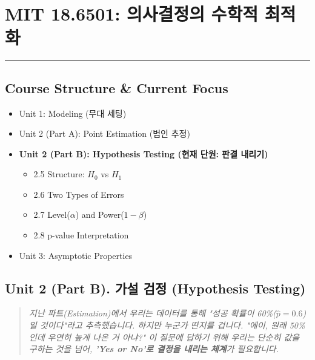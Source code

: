 \documentclass[11pt,a4paper]{book}
\theoremstyle{definition}
\begin{document}
\chapter{MIT 18.6501: 의사결정의 수학적 최적화}
\label{ch:lecture5}


\vspace{1cm}
\hrule
\vspace{1cm}

\section*{Course Structure \& Current Focus}
\begin{itemize}
    \item Unit 1: Modeling (무대 세팅)
    \item Unit 2 (Part A): Point Estimation (범인 추정)
    \item \textbf{\textcolor{mainblue}{Unit 2 (Part B): Hypothesis Testing (현재 단원: 판결 내리기)}}
    \begin{itemize}
        \item 2.5 Structure: $H_0$ vs $H_1$
        \item 2.6 Two Types of Errors
        \item 2.7 Level($\alpha$) and Power($1-\beta$)
        \item 2.8 p-value Interpretation
    \end{itemize}
    \item Unit 3: Asymptotic Properties
\end{itemize}


\section{Unit 2 (Part B). 가설 검정 (Hypothesis Testing)}

\begin{quote}
\textit{지난 파트(Estimation)에서 우리는 데이터를 통해 "성공 확률이 60\%($\hat{p}=0.6$)일 것이다"라고 추측했습니다. 하지만 누군가 딴지를 겁니다. "에이, 원래 50\%인데 우연히 높게 나온 거 아냐?" 이 질문에 답하기 위해 우리는 단순히 값을 구하는 것을 넘어, \textbf{'Yes or No'로 결정을 내리는 체계}가 필요합니다.}
\end{quote}
\end{document}
